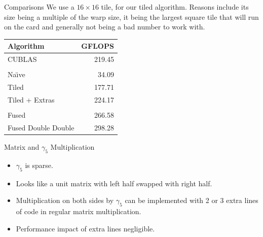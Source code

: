 \documentclass[xcolor=svgnames]{beamer}
\newenvironment{CUDAtiming}%
{\setlength{\extrarowheight}{1.5pt} \begin{center}\begin{tabular}{l|r} Algorithm & GFLOPS\\\hline}%
{\end{tabular}\end{center}}
\begin{document}
\begin{frame}{Comparisons}
 We use a $16 \times 16$ tile, for our tiled algorithm. Reasons include its size being a multiple of the warp size, it being the largest square tile that will run on the card and generally not being a bad number to work with.
 \begin{CUDAtiming}
  CUBLAS & 219.45\\
  \\
  Na{\"\i}ve & 34.09\\
  Tiled & 177.71\\
  \pause
  Tiled + Extras & 224.17\\
  \pause
  \\
  Fused & 266.58\\
  Fused Double Double & 298.28
 \end{CUDAtiming}
\end{frame}

\begin{frame}{Matrix and $\gamma_5$ Multiplication}
 \begin{itemize}
  \item $\gamma_5$ is sparse.
  \item Looks like a unit matrix with left half swapped with right half.
  \item Multiplication on both sides by $\gamma_5$ can be implemented with 2 or 3 extra lines of code in regular matrix multiplication.
  \item Performance impact of extra lines negligible.
 \end{itemize}
 
\end{frame}
\end{document}
